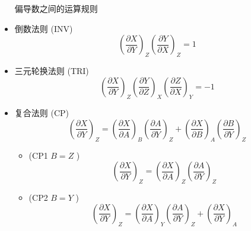 \begin{lemma}
\begin{itemize}
    偏导数之间的运算规则
    \item 倒数法则 (INV)
    \[
    \left( \frac{\partial X}{\partial Y} \right)_Z \left( \frac{\partial Y}{\partial X} \right)_Z = 1
    \]    
    \item 三元轮换法则 (TRI)
    \[
    \left( \frac{\partial X}{\partial Y} \right)_Z \left( \frac{\partial Y}{\partial Z} \right)_X \left( \frac{\partial Z}{\partial X} \right)_Y = -1
    \]
    \item 复合法则 (CP)
    \[
    \left( \frac{\partial X}{\partial Y} \right)_Z = \left( \frac{\partial X}{\partial A} \right)_B \left( \frac{\partial A}{\partial Y} \right)_Z + \left( \frac{\partial X}{\partial B} \right)_A \left( \frac{\partial B}{\partial Y} \right)_Z
    \]
    \begin{itemize}
        \item  (CP1 \( B = Z \) )
        \[
        \left( \frac{\partial X}{\partial Y} \right)_Z = \left( \frac{\partial X}{\partial A} \right)_Z \left( \frac{\partial A}{\partial Y} \right)_Z
        \]
        \item  (CP2 \( B = Y \) )
        \[
        \left( \frac{\partial X}{\partial Y} \right)_Z =  
        \left( \frac{\partial X}{\partial A} \right)_Y \left( \frac{\partial A}{\partial Y} \right)_Z
        +\left( \frac{\partial X}{\partial Y} \right)_A
        \]
    \end{itemize}
\end{itemize}
\end{lemma}
